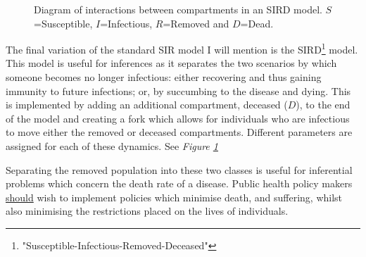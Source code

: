 \documentclass[11pt,a4paper]{article}
\theoremstyle{break}
\begin{document}
  \begin{figure}[H]
    \centering
    \caption{Diagram of interactions between compartments in an SIRD model. $S$=Susceptible, $I$=Infectious, $R$=Removed and $D$=Dead.}
    \label{fig_sird_model_diagram}
  \end{figure}


  \par The final variation of the standard SIR model I will mention is the SIRD\footnote{"Susceptible-Infectious-Removed-Deceased"} model. This model is useful for inferences as it separates the two scenarios by which someone becomes no longer infectious: either recovering and thus gaining immunity to future infections; or, by succumbing to the disease and dying. This is implemented by adding an additional compartment, deceased ($D$), to the end of the model and creating a fork which allows for individuals who are infectious to move either the removed or deceased compartments. Different parameters are assigned for each of these dynamics. See \textit{Figure \ref{fig_sird_model_diagram}}

  \par Separating the removed population into these two classes is useful for inferential problems which concern the death rate of a disease. Public health policy makers \underline{should} wish to implement policies which minimise death, and suffering, whilst also minimising the restrictions placed on the lives of individuals.
\end{document}
